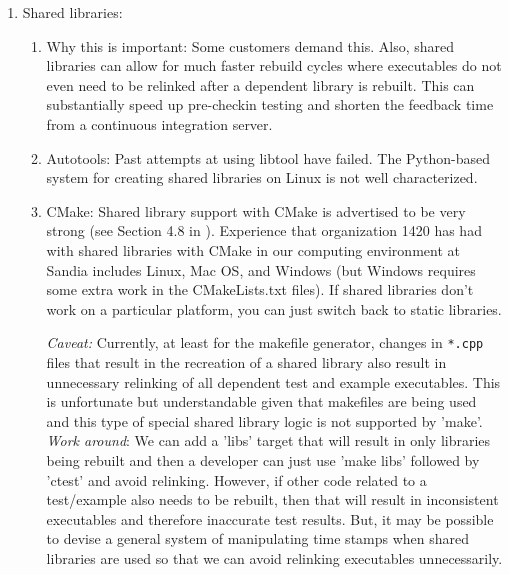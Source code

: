 \documentclass[pdf,ps2pdf,11pt]{SANDreport}
\begin{document}
\begin{enumerate}

{}\item Shared libraries:

  \begin{enumerate}

  {}\item Why this is important: Some customers demand this.  Also,
  shared libraries can allow for much faster rebuild cycles where
  executables do not even need to be relinked after a dependent
  library is rebuilt.  This can substantially speed up pre-checkin
  testing and shorten the feedback time from a continuous integration
  server.

  {}\item Autotools: Past attempts at using libtool have failed.  The
  Python-based system for creating shared libraries on Linux is not
  well characterized.

  {}\item CMake: Shared library support with CMake is advertised to be
  very strong (see Section 4.8 in {}\cite{MasteringCMake_fourth}).
  Experience that organization 1420 has had with shared libraries with
  CMake in our computing environment at Sandia includes Linux, Mac OS,
  and Windows (but Windows requires some extra work in the
  CMakeLists.txt files).  If shared libraries don't work on a
  particular platform, you can just switch back to static libraries.
  
  {}\textit{Caveat:} Currently, at least for the makefile generator,
  changes in {}\texttt{*.cpp} files that result in the recreation of a
  shared library also result in unnecessary relinking of all dependent
  test and example executables.  This is unfortunate but
  understandable given that makefiles are being used and this type of
  special shared library logic is not supported by 'make'.
  {}\textit{Work around}: We can add a 'libs' target that will result
  in only libraries being rebuilt and then a developer can just use
  'make libs' followed by 'ctest' and avoid relinking.  However, if
  other code related to a test/example also needs to be rebuilt, then
  that will result in inconsistent executables and therefore inaccurate
  test results. But, it may be possible to devise a general system of
  manipulating time stamps when shared libraries are used so that we
  can avoid relinking executables unnecessarily.

  \end{enumerate}


\end{enumerate}
\end{document}
